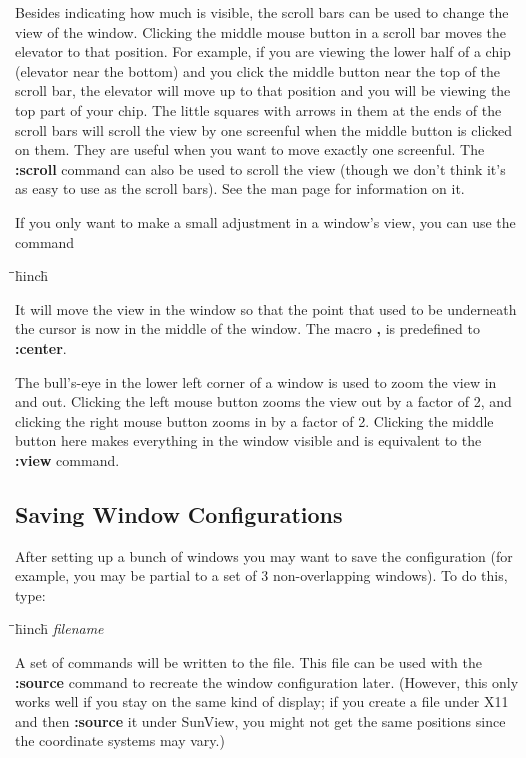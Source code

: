 \documentclass[letterpaper,twoside,12pt]{article}
\def\hinch{\hspace*{0.5in}}
\def\starti{\begin{center}\begin{tabbing}\hinch\=\hinch\=\hinch\=hinch\hinch\=\kill}
\def\endi{\end{tabbing}\end{center}}
\def\ii{\>\>\>}
\begin{document}
Besides indicating how much is visible, the scroll bars can be used to
change the view of the window.  Clicking the middle mouse button in a
scroll bar moves the elevator to that position.  For example, if you
are viewing the lower half of a chip (elevator near the bottom) and you
click the middle button near the top of the scroll bar, the elevator will
move up to that position and you will be viewing the top part of your chip.
The little squares with arrows in them at the ends of the scroll bars
will scroll the view by one screenful when the middle button is clicked
on them.  They are useful when you want to move exactly one screenful.
The {\bfseries :scroll} command can also be used to scroll the view
(though we don't think it's as easy to use as the scroll bars).  See
the man page for information on it.

If you only want to make a small adjustment in a window's view, you
can use the command

\starti
   \ii {\bfseries :center}
\endi

It will move the view in the window so that the point that used to
be underneath the cursor is now in the middle of the window.  The
macro {\bfseries ,} is predefined to {\bfseries :center}.

The bull's-eye in the lower left corner of a window is used to zoom the
view in and out.  Clicking the left mouse button zooms the view out
by a factor of 2, and clicking the right mouse button zooms in by a factor
of 2.  Clicking the middle button here makes everything in the window
visible and is equivalent to the {\bfseries :view} command.

\subsection{Saving Window Configurations}

After setting up a bunch of windows you may want to save the configuration
(for example, you may be partial to a set of 3 non-overlapping windows).
To do this, type:

\starti
   \ii {\bfseries :windowpositions} {\itshape filename}
\endi

A set of commands will be written to the file.  This file can be used
with the {\bfseries :source} command to recreate the window configuration
later. (However, this only works well if you stay on the same kind
of display;  if you create a file under X11 and then {\bfseries :source}
it under SunView, you might not get the same positions since the coordinate
systems may vary.)
\end{document}
